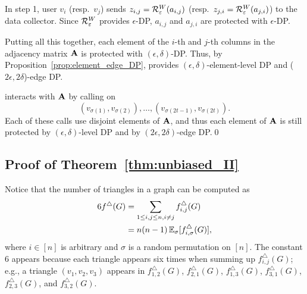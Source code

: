 In step 1, user $v_i$ (resp.~$v_j$) sends $z_{i,j} = \mathcal{R}_{\varepsilon}^W(a_{i,j})$ (resp.~$z_{j,i} = \mathcal{R}_{\varepsilon}^W(a_{j,i})$) to the data collector.
Since $\mathcal{R}_{\varepsilon}^W$ provides $\epsilon$-DP, $a_{i,j}$ and $a_{j,i}$ are protected with $\epsilon$-DP.

Putting all this together, each element of the $i$-th and $j$-th columns in the adjacency matrix $\mathbf{A}$ is protected with $(\epsilon, \delta)$-DP.
Thus, by Proposition~\ref{prop:element_edge_DP},
\AlgWSLE{}
provides $(\epsilon, \delta)$-element-level DP and ($2\epsilon, 2\delta$)-edge DP.

\AlgWSTri{} interacts with $\mathbf{A}$ by calling \AlgWSLE{} on \[(v_{\sigma(1)},
v_{\sigma(2)}), \ldots, (v_{\sigma(2t-1)}, v_{\sigma(2t)}).\] Each of these calls
use disjoint elements of $\mathbf{A}$, and thus each element of $\mathbf{A}$ is still
protected by $(\epsilon, \delta)$-level DP and by $(2\epsilon, 2\delta)$-edge
DP.\qed

\subsection{Proof of Theorem~\ref{thm:unbiased_II}}
\label{sub:unbiased_II_proof}
Notice that the number of triangles in a graph can be computed as
\begin{align}
  6f^\triangle(G) &= \sum_{1 \leq i,j \leq n, i\neq j} f^\triangle_{i,j}(G)
  \nonumber \\
  &= n(n-1) \operatorname{\mathbb{E}}_{\sigma}[f^\triangle_{i,
  \sigma}(G)],\label{eq:triangle-sample-est}
\end{align}
where $i \in [n]$ is arbitrary and $\sigma$ is a random permutation on
$[n]$. The constant $6$ appears because each triangle
appears six times when summing up $f^\triangle_{i,j}(G)$; e.g., a triangle $(v_1, v_2, v_3)$ appears in $f^\triangle_{1,2}(G)$, $f^\triangle_{2,1}(G)$,
$f^\triangle_{1,3}(G)$,
$f^\triangle_{3,1}(G)$,
$f^\triangle_{2,3}(G)$, and
$f^\triangle_{3,2}(G)$.

